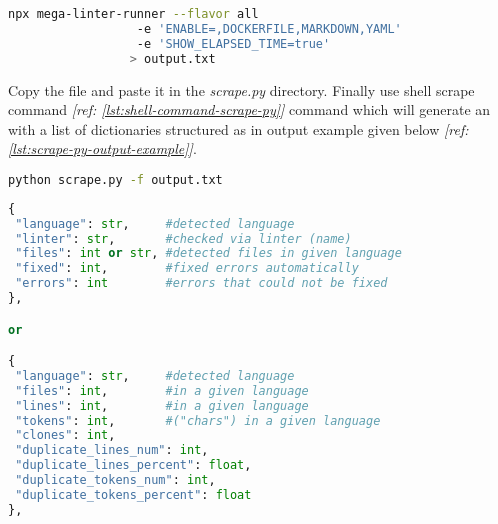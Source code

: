 \begin{lstlisting}[language=Bash, label={lst:shell-command-run-linter}]
npx mega-linter-runner --flavor all
                  -e 'ENABLE=,DOCKERFILE,MARKDOWN,YAML'
                  -e 'SHOW_ELAPSED_TIME=true'
                 > output.txt
\end{lstlisting}

Copy the file and paste it in the \emph{scrape.py} directory. Finally use shell scrape command \textit{[ref: \ref{lst:shell-command-scrape-py}]} command which will generate an  with a list of dictionaries structured as in output example given below \textit{[ref: \ref{lst:scrape-py-output-example}]}.

\begin{lstlisting}[language=Bash, label={lst:shell-command-scrape-py}]
python scrape.py -f output.txt
\end{lstlisting}

\begin{lstlisting}[language=Python, label={lst:scrape-py-output-example}]
{
 "language": str,     #detected language
 "linter": str,       #checked via linter (name)
 "files": int or str, #detected files in given language
 "fixed": int,        #fixed errors automatically
 "errors": int        #errors that could not be fixed
},

or

{
 "language": str,     #detected language
 "files": int,        #in a given language
 "lines": int,        #in a given language
 "tokens": int,       #("chars") in a given language
 "clones": int,
 "duplicate_lines_num": int,
 "duplicate_lines_percent": float,
 "duplicate_tokens_num": int,
 "duplicate_tokens_percent": float
},
\end{lstlisting}
